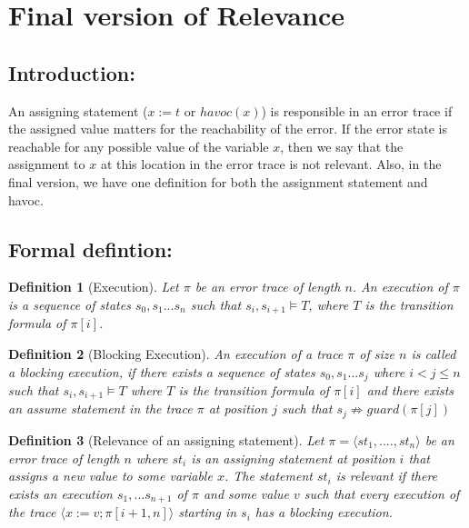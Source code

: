 \documentclass{article}
\newcommand{\limp}{\Rightarrow}
\newtheorem{mydef}{Definition}
\begin{document}
\section{Final version of Relevance}
\subsection{Introduction:}
An assigning statement ($x := t$ or $havoc(x)$) is responsible in an error trace if the assigned value matters for the reachability of the error. If the error state is reachable for any possible value of the variable $x$, then we say that the assignment to $x$ at this location in the error trace is not relevant. Also, in the final version, we have one definition for both the assignment statement and havoc. 
\subsection{Formal defintion:}
\begin{mydef}[Execution]\label{mydef:execution}
Let $\pi$ be an error trace of length $n$. An execution of $\pi$ is a sequence of states $s_0, s_1 ... s_n$ such that $s_i, s_{i+1} \vDash T$, where $T$ is the transition formula of $\pi[i]$.
\end{mydef}
\begin{mydef}[Blocking Execution]\label{mydef:blocked_execution}
An execution of a trace $\pi$ of size $n$ is called a blocking execution, if there exists a sequence of states $s_0,s_1...s_j$ where $i<j \leq n$ such that $s_i, s_{i+1} \vDash T$ where $T$ is the transition formula of $\pi[i]$ and there exists an assume statement in the trace $\pi$ at position $j$ such that $s_j \not \limp guard(\pi[j])$
\end{mydef}

\begin{mydef}[Relevance of an assigning statement]\label{mydef:responsible}
Let $\pi = \langle st_1,....,st_n \rangle$ be an error trace of length $n$ where $st_i$ is an assigning statement at position $i$ that assigns a new value to some variable $x$. The statement $st_i$ is relevant if there exists an execution $s_1,...s_{n+1}$ of $\pi$ and some value $v$ such that every execution of the trace $\langle x:=v; \pi[i+1,n] \rangle$ starting in $s_i$ has a blocking execution.
\end{mydef}
\end{document}

